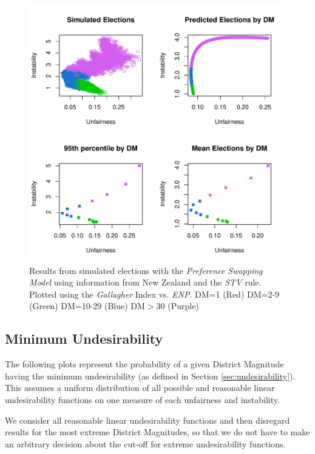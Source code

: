 \documentclass{article}
\begin{document}
\begin{figure}[]
\includegraphics[scale=1.00]{images/nzprefswap_gallagher_enp.pdf}
\caption{Results from simulated elections with the \emph{Preference Swapping Model} using information from New Zealand and the \emph{STV} rule. Plotted using the \emph{Gallagher} Index vs. \emph{ENP}. DM=1 (Red) DM=2-9 (Green) DM=10-29 (Blue) DM$>$30 (Purple)}
\label{fig:stv_nzprefswap}
\end{figure}


\newpage
\subsection{Minimum Undesirability}
The following plots represent the probability of a given District Magnitude having the minimum undesirability (as defined in Section \ref{sec:undesirability}). This assumes a uniform distribution of all possible and reasonable linear undesirability functions on one measure of each unfairness and instability.

We consider all reasonable linear undesirability functions and then disregard results for the most extreme District Magnitudes, so that we do not have to make an arbitrary decision about the cut-off for extreme undesirability functions.
\end{document}
